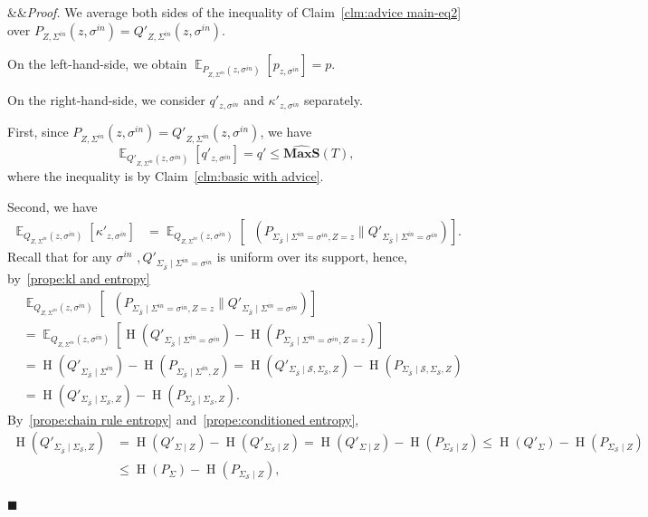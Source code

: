 \documentclass[11pt]{article}
\renewenvironment{proof}[1][]
    {\noindent
       \ifx&#1&{\it Proof.}
       \else{\it Proof ({#1}).}
       \fi}{\hfill $\blacksquare$}
\DeclareMathOperator*{\E}{\mathbb{E}}
\DeclareMathOperator{\HH}{H}
\DeclareMathOperator{\KL}{D_{\text{KL}}}
\newcommand{\MAXS}{\boldsymbol{MaxS}}
\begin{document}
\medskip
\begin{proof} [of Theorem~\ref{thm:pc to middle}]
We average both sides of the inequality of Claim~\ref{clm:advice main-eq2} 
over $P_{Z,\Sigma^{in} }(z,\sigma^{in}) = Q'_{Z,\Sigma^{in} }(z,\sigma^{in})$.

On the left-hand-side, we obtain
$
\E_{P_{Z,\Sigma^{in}}(z, \sigma^{in} )}
[p_{z,\sigma^{in} }]
= p$.

On the right-hand-side,
we consider $q'_{z, \sigma^{in}}$ and $\kappa'_{z,\sigma^{in} }$ separately.

First, since
$P_{Z,\Sigma^{in} }(z,\sigma^{in}) = Q'_{Z, \Sigma^{in} }(z,\sigma^{in})$, we have
$$
\E_{Q'_{Z,\Sigma^{in}}(z,\sigma^{in})}[
q'_{z, \sigma^{in}} ] =
q' \leq 
\widehat{\MAXS}(T),$$
where the inequality is by Claim~\ref{clm:basic with advice}.

Second, we have
\begin{align*} 
\E_{Q_{Z,\Sigma^{in}}(z, \sigma^{in} )} [ \kappa'_{z,\sigma^{in} } ] 
&=  
\E_{Q_{Z,\Sigma^{in}}(z, \sigma^{in} )} [ \KL( P_{ \Sigma_{\overline{\mathcal{S}}} \mid \Sigma^{in} = \sigma^{in} , Z = z} \| Q'_{ \Sigma_{ \overline{\mathcal{S}} } \mid \Sigma^{in} = \sigma^{in} } ) ]. 
\end{align*}
Recall that 
for any $\sigma^{in}$
$,
Q'_{ \Sigma_{ \overline{\mathcal{S}} } \mid \Sigma^{in} = \sigma^{in} }$
is uniform 
over its support, hence, by~\ref{prope:kl and entropy}
\begin{align*} 
& \E_{Q_{Z,\Sigma^{in}}(z, \sigma^{in} )} [ \KL( P_{ \Sigma_{\overline{\mathcal{S}}} \mid \Sigma^{in} = \sigma^{in} , Z = z } \| Q'_{ \Sigma_{ \overline{\mathcal{S}} } \mid \Sigma^{in} = \sigma^{in} } ) ] \\
&= 
\E_{Q_{Z,\Sigma^{in}}(z, \sigma^{in} )}[\HH(Q'_{\Sigma_{ \overline{\mathcal{S}} } \mid \Sigma^{in} = \sigma^{in}} ) - 
\HH(P_{ \Sigma_{\overline{\mathcal{S}}} \mid \Sigma^{in} = \sigma^{in} , Z = z } ) ] \\
&= 
\HH(Q'_{\Sigma_{ \overline{\mathcal{S}} } \mid \Sigma^{in}} ) - 
\HH(P_{ \Sigma_{\overline{\mathcal{S}}} \mid \Sigma^{in} , Z} )
= 
\HH(Q'_{\Sigma_{ \overline{\mathcal{S}} } \mid \mathcal{S},\Sigma_{\mathcal{S} },Z } ) - 
\HH(P_{ \Sigma_{\overline{\mathcal{S}}} \mid \mathcal{S},\Sigma_{\mathcal{S} },Z} ) \\
&=
\HH(Q'_{\Sigma_{ \overline{\mathcal{S}} } \mid \Sigma_{\mathcal{S}},Z } ) - 
\HH(P_{ \Sigma_{\overline{\mathcal{S}}} \mid \Sigma_{\mathcal{S}},Z} ).
\end{align*} 
By~\ref{prope:chain rule entropy} and~\ref{prope:conditioned entropy},
\begin{align*} 
\HH(Q'_{\Sigma_{ \overline{\mathcal{S}} } \mid \Sigma_{\mathcal{S}},Z } ) 
&= 
\HH(Q'_{ \Sigma \mid Z} ) - 
\HH(Q'_{ \Sigma_{\mathcal{S}} \mid Z}) = 
\HH(Q'_{ \Sigma \mid Z} ) - 
\HH(P_{ \Sigma_{\mathcal{S}} \mid Z}) \leq
\HH(Q'_{ \Sigma} ) - 
\HH(P_{ \Sigma_{\mathcal{S}} \mid Z}) \\
&\leq 
\HH(P_{ \Sigma} ) - 
\HH(P_{ \Sigma_{\mathcal{S}} \mid Z}),
\end{align*} 


\end{proof}
\end{document}
